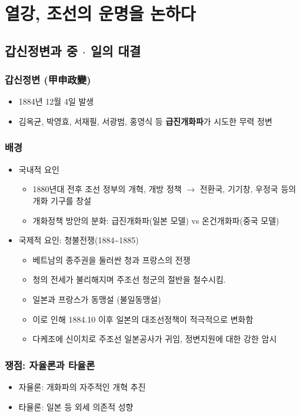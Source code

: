 \section{열강, 조선의 운명을 논하다}

\subsection{갑신정변과 중 $\cdot$ 일의 대결}

\subsubsection*{갑신정변 (甲申政變)}
\begin{itemize}
    \item 1884년 12월 4일 발생
    \item 김옥균, 박영효, 서재필, 서광범, 홍영식 등 \textbf{급진개화파}가 시도한 무력 정변
\end{itemize}

\subsubsection*{배경}
\begin{itemize}
    \item 국내적 요인
    \begin{itemize}
        \item 1880년대 전후 조선 정부의 개혁, 개방 정책 $\rightarrow$ 전환국, 기기창, 우정국 등의 개화 기구를 창설
        \item 개화정책 방안의 분화: 급진개화파(일본 모델) vs 온건개화파(중국 모델)
    \end{itemize}
    \item 국제적 요인: 청불전쟁(1884\textasciitilde{}1885)
    \begin{itemize}
        \item 베트남의 종주권을 둘러싼 청과 프랑스의 전쟁
        \item 청의 전세가 불리해지며 주조선 청군의 절반을 철수시킴.
        \item 일본과 프랑스가 동맹설 (불일동맹설)
        \item 이로 인해 1884.10 이후 일본의 대조선정책이 적극적으로 변화함
        \item 다케조에 신이치로 주조선 일본공사가 귀임, 정변지원에 대한 강한 암시
    \end{itemize}
\end{itemize}

\subsubsection*{쟁점: 자율론과 타율론}
\begin{itemize}
    \item 자율론: 개화파의 자주적인 개혁 추진
    \item 타율론: 일본 등 외세 의존적 성향
\end{itemize}

